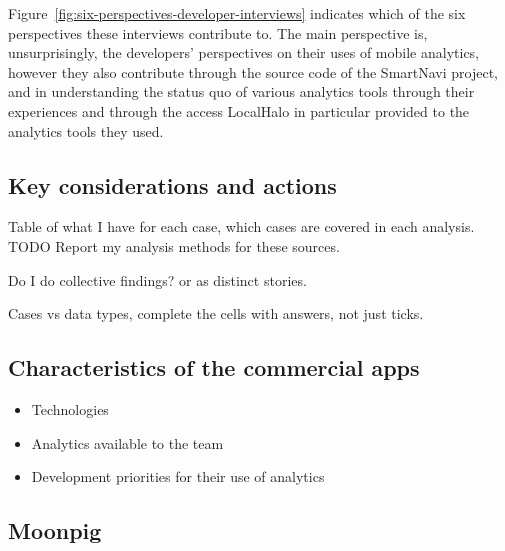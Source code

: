 Figure~\ref{fig:six-perspectives-developer-interviews} indicates which of the six perspectives these interviews contribute to. The main perspective is, unsurprisingly, the developers' perspectives on their uses of mobile analytics, however they also contribute through the source code of the SmartNavi project, and in understanding the status quo of various analytics tools through their experiences and through the access LocalHalo in particular provided to the analytics tools they used.


\dotfill
\subsection{Key considerations and actions}
Table of what I have for each case, which cases are covered in each analysis.
TODO Report my analysis methods for these sources.

Do I do collective findings? or as distinct stories.

Cases vs data types, complete the cells with answers, not just ticks.


\subsection{Characteristics of the commercial apps}

\begin{itemize}
    \item Technologies
    \item Analytics available to the team
    \item Development priorities for their use of analytics
\end{itemize}

\subsection{Moonpig}~\label{study-moonpig}


